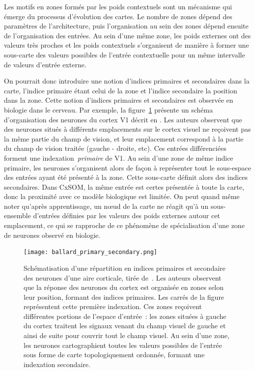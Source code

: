 \documentclass[../main]{subfiles}
\begin{document}
Les motifs en zones formés par les poids contextuels sont un mécanisme qui émerge du processus d'évolution des cartes.
Le nombre de zones dépend des paramètres de l'architecture, puis l'organisation au sein des zones dépend ensuite de l'organisation des entrées. 
Au sein d'une même zone, les poids externes ont des valeurs très proches et les poids contextuels s'organisent de manière à former une sous-carte des valeurs possibles de l'entrée contextuelle pour un même intervalle de valeurs d'entrée externe.

On pourrait donc introduire une notion d'indices primaires et secondaires dans la carte, l'indice primaire étant celui de la zone et l'indice secondaire la position dans la zone.
Cette notion d'indices primaires et secondaires est observée en biologie dans le cerveau. 
Par exemple, la figure~\ref{fig:ballard} présente un schéma d'organisation des neurones du cortex V1 décrit en \cite{ballard_cortical_1986}.
Les auteurs observent que des neurones situés à différents emplacements sur le cortex visuel ne reçoivent pas la même partie du champ de vision, et leur emplacement correspond à la partie du champ de vision traitée (gauche - droite, etc).
Ces entrées différenciées forment une indexation~\emph{primaire} de V1. 
Au sein d'une zone de même indice primaire, les neurones s'organisent alors de façon à représenter tout le sous-espace des entrées ayant été présenté à la zone. Cette sous-carte définit alors des indices secondaires.
Dans CxSOM, la même entrée est certes présentée à toute la carte, donc la proximité avec ce modèle biologique est limitée. On peut quand même noter qu'après apprentissage, un n\oe{}ud de la carte ne réagit qu'à un sous-ensemble d'entrées définies par les valeurs des poids externes autour cet emplacement, ce qui se rapproche de ce phénomène de spécialisation d'une zone de neurones observé en biologie.

\begin{figure}[H]
	\centering\texttt{[image: ballard\_primary\_secondary.png]}
	\vspace{-0.5cm}
	\caption{Schématisation d'une répartition en indices primaires et secondaire des neurones d'une aire corticale, tirée de~\cite{ballard_cortical_1986}. 
	Les auteurs observent que la réponse des neurones du cortex est organisée en zones selon leur position, formant des indices primaires. Les carrés de la figure représentent cette première indexation.
	Ces zones reçoivent différentes portions de l'espace d'entrée~: les zones situées à gauche du cortex traitent les signaux venant du champ visuel de gauche et ainsi de suite pour couvrir tout le champ visuel.
	Au sein d'une zone, les neurones cartographient toutes les valeurs possibles de l'entrée sous forme de carte topologiquement ordonnée, formant une indexation secondaire. \label{fig:ballard}}
\end{figure}
\end{document}
